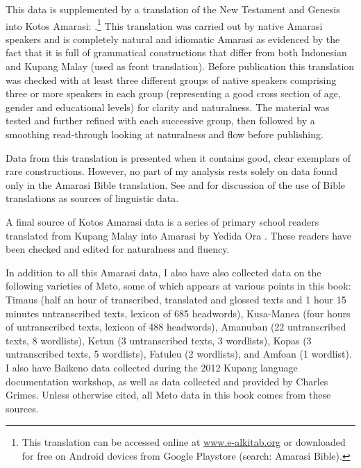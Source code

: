 This data is supplemented by a translation
of the New Testament and Genesis into Kotos Amarasi: \citet{UBB15}.\footnote{
		This translation can be accessed online at \url{www.e-alkitab.org}
		or downloaded for free on Android devices from Google Playstore (search: Amarasi Bible).}
This translation was carried out by native Amarasi speakers
and is completely natural and idiomatic Amarasi as evidenced
by the fact that it is full of grammatical constructions that differ
from both Indonesian and Kupang Malay (used as front translation).
Before publication this translation was checked with at least three different
groups of native speakers comprising three or more speakers in each group
(representing a good cross section of age, gender and educational levels) for clarity and naturalness.
The material was tested and further refined with each successive group,
then followed by a smoothing read-through looking at naturalness and flow before publishing.

Data from this translation is presented
when it contains good, clear exemplars of rare constructions.
However, no part of my analysis rests
solely on data found only in the Amarasi Bible translation.
See \cite{hehawi11} and \citet[2]{dryer13} for discussion of
the use of Bible translations as sources of linguistic data.

A final source of Kotos Amarasi data is a series
of primary school readers translated from Kupang Malay
into Amarasi by Yedida Ora \citep{or16,or16b,or16c}.
These readers have been checked and edited for naturalness and fluency.

In addition to all this Amarasi data, I also have also
collected data on the following varieties of Meto,
some of which appears at various points in this book:
Timaus (half an hour of transcribed, translated and glossed texts and
1 hour 15 minutes untranscribed texts, lexicon of 685 headwords),
Kusa-Manea (four hours of untranscribed texts, lexicon of 488 headwords),
Amanuban (22 untranscribed texts, 8 wordlists),
Ketun (3 untranscribed texts, 3 wordlists),
Kopas (3 untranscribed texts, 5 wordlists),
Fatule{\Q}u (2 wordlists), and
Amfo{\Q}an (1 wordlist).
I also have Baikeno data collected during
the 2012 Kupang language documentation workshop,
as well as data collected and provided by Charles Grimes.
Unless otherwise cited, all Meto data in this book comes
from these sources.